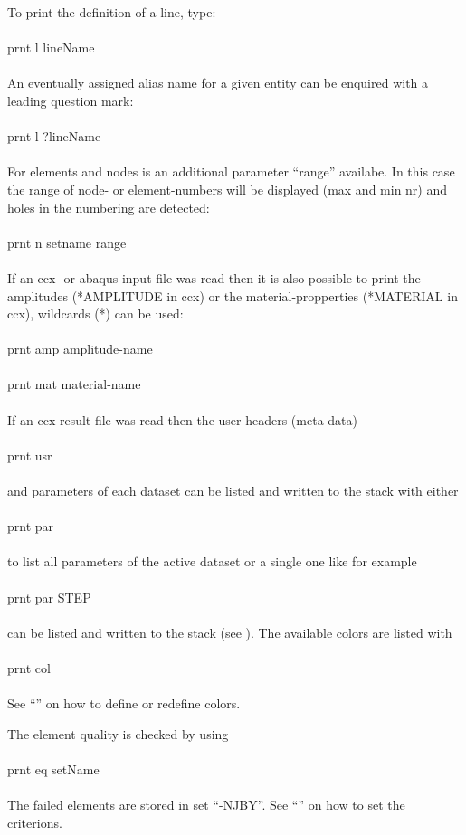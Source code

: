 \documentclass{article}
\begin{document}
To print the definition of a line, type:\\\\prnt l lineName\\\\An eventually assigned alias name for a given entity can be enquired with a leading question mark:\\\\prnt l ?lineName\\\\For elements and nodes is an additional parameter ``range'' availabe. In this case the range of node- or element-numbers will be displayed (max and min nr) and holes in the numbering are detected:\\\\prnt n setname range\\\\ If an ccx- or abaqus-input-file was read then it is also possible to print the amplitudes (*AMPLITUDE in ccx) or the material-propperties (*MATERIAL in ccx), wildcards (*) can be used:\\\\prnt amp amplitude-name\\\\prnt mat material-name\\\\
If an ccx result file was read then the user headers (meta data)\\\\prnt usr\\\\and parameters of each dataset can be listed and written to the stack with either\\\\prnt par\\\\to list all parameters of the active dataset or a single one like for example \\\\prnt par STEP\\\\can be listed and written to the stack (see ). The available colors are listed with\\\\prnt col\\\\See ``'' on how to define or redefine colors. 

The element quality is checked by using\\\\prnt eq setName\\\\The failed elements are stored in set ``-NJBY''. See ``'' on how to set the criterions.
\end{document}
